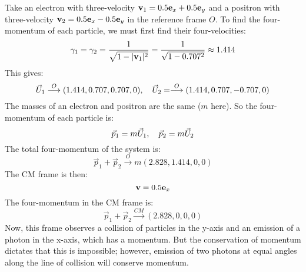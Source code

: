 \documentclass{report}
\theoremstyle{definition}
\begin{document}
\begin{chapter2}\label{prob: 24}
	Take an electron with three-velocity ${\bf v}_1 = 0.5{\bf e}_x + 0.5{\bf e}_y$ and a positron with three-velocity ${\bf v}_2 = 0.5{\bf e}_x - 0.5{\bf e}_y$ in the reference frame $O$. To find the four-momentum of each particle, we must first find their four-velocities:
	\begin{equation}
		\gamma_1 = \gamma_2 = \frac{1}{\sqrt{1 - |{\bf v}_1|^2}} = \frac{1}{\sqrt{1 - 0.707^2}} \approx 1.414 
	\end{equation}
	This gives:
	\begin{equation}
		\vec U_1 \stackrel{O}\longrightarrow (1.414, 0.707, 0.707, 0), \hspace{10 pt} \vec U_2 = \stackrel{O}\longrightarrow (1.414, 0.707, -0.707, 0)
	\end{equation}
	The masses of an electron and positron are the same ($m$ here). So the four-momentum of each particle is:
	\begin{equation}
		\vec p_1 = m \vec U_1, \hspace{10 pt} \vec p_2 = m \vec U_2 		
	\end{equation} 
	The total four-momentum of the system is:
	\begin{equation}
		\vec p_1 + \vec p_2 \stackrel{O}\longrightarrow m(2.828, 1.414, 0, 0)
	\end{equation}
	The CM frame is then:
	\begin{equation}
		{\bf v} = 0.5{\bf e}_x
	\end{equation}
	The four-momentum in the CM frame is:
	\begin{equation}
		\vec p_1 + \vec p_2 \stackrel{CM}\longrightarrow (2.828, 0, 0, 0)
	\end{equation}
	Now, this frame observes a collision of particles in the y-axis and an emission of a photon in the x-axis, which has a momentum. But the conservation of momentum dictates that this is impossible; however, emission of two photons at equal angles along the line of collision will conserve momentum.  
\end{chapter2}
\end{document}
